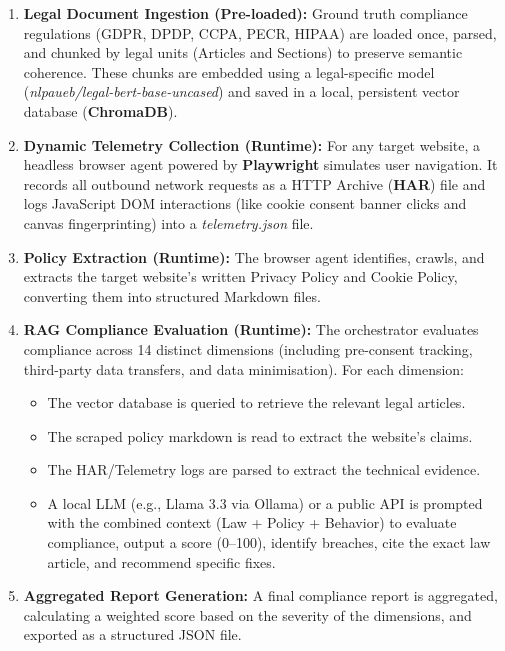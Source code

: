 \documentclass[11pt,a4paper]{article}
\begin{document}
\begin{enumerate}
    \item \textbf{Legal Document Ingestion (Pre-loaded):} Ground truth compliance regulations (GDPR, DPDP, CCPA, PECR, HIPAA) are loaded once, parsed, and chunked by legal units (Articles and Sections) to preserve semantic coherence. These chunks are embedded using a legal-specific model (\textsl{nlpaueb/legal-bert-base-uncased}) and saved in a local, persistent vector database (\textbf{ChromaDB}).
    \item \textbf{Dynamic Telemetry Collection (Runtime):} For any target website, a headless browser agent powered by \textbf{Playwright} simulates user navigation. It records all outbound network requests as a HTTP Archive (\textbf{HAR}) file and logs JavaScript DOM interactions (like cookie consent banner clicks and canvas fingerprinting) into a \textsl{telemetry.json} file.
    \item \textbf{Policy Extraction (Runtime):} The browser agent identifies, crawls, and extracts the target website's written Privacy Policy and Cookie Policy, converting them into structured Markdown files.
    \item \textbf{RAG Compliance Evaluation (Runtime):} The orchestrator evaluates compliance across 14 distinct dimensions (including pre-consent tracking, third-party data transfers, and data minimisation). For each dimension:
    \begin{itemize}
        \item The vector database is queried to retrieve the relevant legal articles.
        \item The scraped policy markdown is read to extract the website's claims.
        \item The HAR/Telemetry logs are parsed to extract the technical evidence.
        \item A local LLM (e.g., Llama 3.3 via Ollama) or a public API is prompted with the combined context (Law + Policy + Behavior) to evaluate compliance, output a score (0--100), identify breaches, cite the exact law article, and recommend specific fixes.
    \end{itemize}
    \item \textbf{Aggregated Report Generation:} A final compliance report is aggregated, calculating a weighted score based on the severity of the dimensions, and exported as a structured JSON file.
\end{enumerate}
\end{document}
